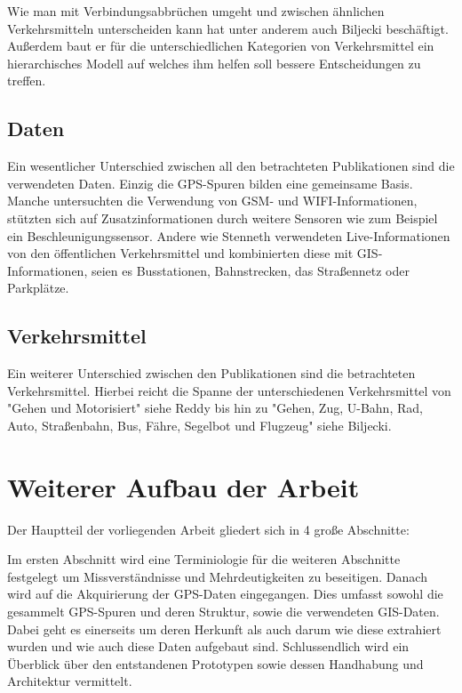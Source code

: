 Wie man mit Verbindungsabbrüchen umgeht und zwischen ähnlichen Verkehrsmitteln unterscheiden kann hat unter anderem auch Biljecki beschäftigt. Außerdem baut er für die unterschiedlichen Kategorien von Verkehrsmittel ein hierarchisches Modell auf welches ihm helfen soll bessere Entscheidungen zu treffen.

\subsection{Daten}
Ein wesentlicher Unterschied zwischen all den betrachteten Publikationen sind die verwendeten Daten. Einzig die GPS-Spuren bilden eine gemeinsame Basis. Manche untersuchten die Verwendung von  GSM- und WIFI-Informationen,  stützten sich auf Zusatzinformationen durch weitere Sensoren wie zum Beispiel ein Beschleunigungssensor. Andere wie Stenneth verwendeten Live-Informationen von den öffentlichen Verkehrsmittel und kombinierten diese mit GIS-Informationen, seien es Busstationen, Bahnstrecken, das Straßennetz oder Parkplätze.

\subsection{Verkehrsmittel}
Ein weiterer Unterschied zwischen den Publikationen sind die betrachteten Verkehrsmittel. Hierbei reicht die Spanne der unterschiedenen Verkehrsmittel von "Gehen und Motorisiert" siehe Reddy bis hin zu "Gehen, Zug, U-Bahn, Rad, Auto, Straßenbahn, Bus, Fähre, Segelbot und Flugzeug"  siehe Biljecki.

\section{Weiterer Aufbau der Arbeit}
Der Hauptteil der vorliegenden Arbeit gliedert sich in 4 große Abschnitte:

Im ersten Abschnitt wird eine Terminiologie für die weiteren Abschnitte festgelegt um Missverständnisse und Mehrdeutigkeiten zu beseitigen. Danach wird auf die Akquirierung der GPS-Daten eingegangen. Dies umfasst sowohl die gesammelt GPS-Spuren und deren Struktur, sowie die verwendeten GIS-Daten. Dabei geht es einerseits um deren Herkunft als auch darum wie diese extrahiert wurden und wie auch diese Daten aufgebaut sind. Schlussendlich wird ein Überblick über den entstandenen Prototypen sowie dessen Handhabung und Architektur vermittelt. 

